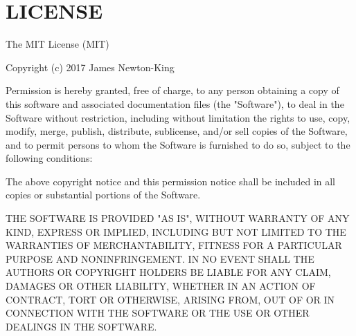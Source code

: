 \chapter{LICENSE}
\hypertarget{md__c_1_2_users_2jnyaz_2source_2repos_2_media_tek_documents_2packages_2_newtonsoft_8_json_8_bson_81_80_82_2_l_i_c_e_n_s_e}{}\label{md__c_1_2_users_2jnyaz_2source_2repos_2_media_tek_documents_2packages_2_newtonsoft_8_json_8_bson_81_80_82_2_l_i_c_e_n_s_e}
The MIT License (MIT)

Copyright (c) 2017 James Newton-\/\+King

Permission is hereby granted, free of charge, to any person obtaining a copy of this software and associated documentation files (the "{}\+Software"{}), to deal in the Software without restriction, including without limitation the rights to use, copy, modify, merge, publish, distribute, sublicense, and/or sell copies of the Software, and to permit persons to whom the Software is furnished to do so, subject to the following conditions\+:

The above copyright notice and this permission notice shall be included in all copies or substantial portions of the Software.

THE SOFTWARE IS PROVIDED "{}\+AS IS"{}, WITHOUT WARRANTY OF ANY KIND, EXPRESS OR IMPLIED, INCLUDING BUT NOT LIMITED TO THE WARRANTIES OF MERCHANTABILITY, FITNESS FOR A PARTICULAR PURPOSE AND NONINFRINGEMENT. IN NO EVENT SHALL THE AUTHORS OR COPYRIGHT HOLDERS BE LIABLE FOR ANY CLAIM, DAMAGES OR OTHER LIABILITY, WHETHER IN AN ACTION OF CONTRACT, TORT OR OTHERWISE, ARISING FROM, OUT OF OR IN CONNECTION WITH THE SOFTWARE OR THE USE OR OTHER DEALINGS IN THE SOFTWARE. 